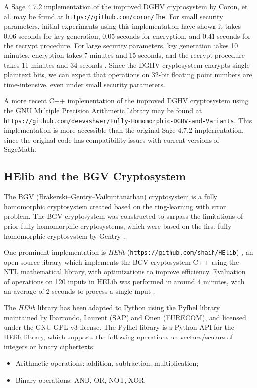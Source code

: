 A Sage 4.7.2 implementation of the improved DGHV cryptosystem by Coron, et al. \cite{cryptoeprint:2011:440} may be found at \texttt{https://github.com/coron/fhe}. For small security parameters,  initial experiments using this implementation have shown it takes 0.06 seconds for key generation, 0.05 seconds for encryption, and 0.41 seconds for the recrypt procedure. For large security parameters, key generation takes 10 minutes, encryption takes 7 minutes and 15 seconds, and the recrypt procedure takes 11 minutes and 34 seconds \cite{cryptoeprint:2011:440}. Since the DGHV cryptosystem encrypts single plaintext bits, we can expect that operations on 32-bit floating point numbers are time-intensive, even under small security parameters.

A more recent C++ implementation of the improved DGHV cryptosystem \cite{cryptoeprint:2011:440} using the GNU Multiple Precision Arithmetic Library may be found at \texttt{https://github.com/deevashwer/Fully-Homomorphic-DGHV-and-Variants}. This implementation is more accessible than the original Sage 4.7.2 implementation, since the original code has compatibility issues with current versions of SageMath.

\subsection{HElib and the BGV Cryptosystem}
The BGV (Brakerski--Gentry--Vaikuntanathan) cryptosystem \cite{cryptoeprint:2011:277} is a fully homomorphic cryptosystem created based on the ring-learning with error problem. The BGV cryptosystem was constructed to surpass the limitations of prior fully homomorphic cryptosystems, which were based on the first fully homomorphic cryptosystem by Gentry \cite{gentry_fully_2009}.

One prominent implementation is \textit{HElib} (\texttt{https://github.com/shaih/HElib}) \cite{garay_algorithms_2014}, an open-source library which implements the BGV cryptosystem C++ using the NTL mathematical library, with optimizations to improve efficiency. Evaluation of operations on 120 inputs in HELib was performed in around 4 minutes, with an average of 2 seconds to process a single input \cite{hutchison_fully_2010,cryptoeprint:2011:566}.

The \textit{HElib} library has been adapted to Python using the Pyfhel library \cite{pyfhel_2018} maintained by Ibarrondo, Laurent (SAP) and Onen (EURECOM), and licensed under the GNU GPL v3 license. The Pyfhel library is a Python API for the HElib library, which supports the following operations on vectors/scalars of integers or binary ciphertexts:
\begin{itemize}
	\item Arithmetic operations: addition, subtraction, multiplication;
	\item Binary operations: AND, OR, NOT, XOR.
\end{itemize}
